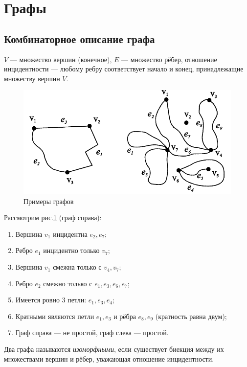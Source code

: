 \section{Графы}

\subsection{Комбинаторное описание графа}
\begin{definition}
    $V$ — множество вершин (конечное), $E$ — множество рёбер, отношение инцидентности — любому ребру соответствует начало и конец, принадлежащие множеству вершин $V$.
\end{definition}

\begin{figure}[h]
    \centering
    \includegraphics[scale=0.7]{images/c3.1.2.png}
    \caption{Примеры графов}
    \label{fig:c3.1}
\end{figure}

Рассмотрим рис.\ref{fig:c3.1} (граф справа):
\begin{enumerate}
    \item Вершина $v_1$ инцидентна $e_2, e_7$;
    \item Ребро $e_1$ инцидентно только $v_7$;
    \item Вершина $v_1$ смежна только с $v_4, v_7$;
    \item Ребро $e_2$ смежно только с $e_1, e_3, e_6, e_7$;
    \item Имеется ровно 3 петли: $e_1, e_3, e_4$;
    \item Кратными являются петли $e_1, e_3$ и рёбра $e_8, e_9$ (кратность равна двум);
    \item Граф справа — не простой, граф слева — простой.
\end{enumerate}

\begin{definition}
    Два графа называются \textit{изоморфными}, если существует биекция между их множествами вершин и рёбер, уважающая отношение инцидентности.
\end{definition}

